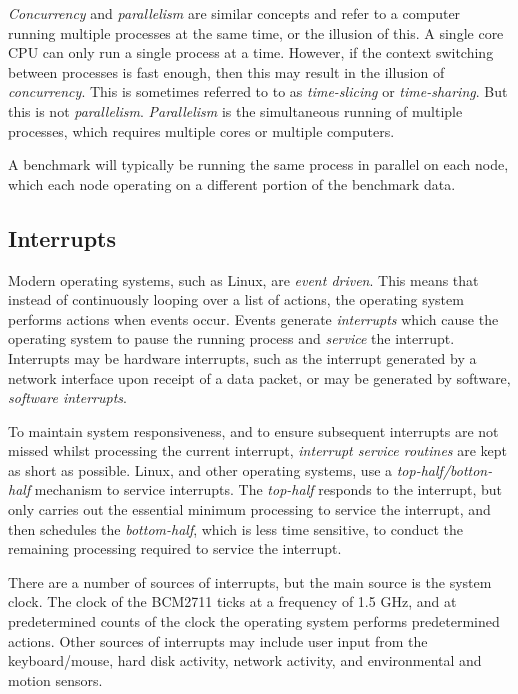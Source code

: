 \emph{Concurrency} and \emph{parallelism} are similar concepts and refer to a computer running multiple processes at the same time, or the illusion of this. A single core CPU can only run a single process at a time. However, if the context switching between processes is fast enough, then this may result in the illusion of \emph{concurrency}. This is sometimes referred to to as \emph{time-slicing} or \emph{time-sharing}. But this is not \emph{parallelism}. \emph{Parallelism} is the simultaneous running of multiple processes, which requires multiple cores or multiple computers.

A benchmark will typically be running the same process in parallel on each node, which each node operating on a different portion of the benchmark data.


\subsection{Interrupts}

Modern operating systems, such as Linux, are \emph{event driven}. This means that instead of continuously looping over a list of actions, the operating system performs actions when events occur. Events generate \emph{interrupts} which cause the operating system to pause the running process and \emph{service} the interrupt. Interrupts may be hardware interrupts, such as the interrupt generated by a network interface upon receipt of a data packet, or may be generated by software, \emph{software interrupts}.

To maintain system responsiveness, and to ensure subsequent interrupts are not missed whilst processing the current interrupt, \emph{interrupt service routines} are kept as short as possible. Linux, and other operating systems, use a \emph{top-half/botton-half} mechanism to service interrupts. The \emph{top-half} responds to the interrupt, but only carries out the essential minimum processing to service the interrupt, and then schedules the \emph{bottom-half}, which is less time sensitive, to conduct the remaining processing required to service the interrupt.

There are a number of sources of interrupts, but the main source is the system clock. The clock of the BCM2711 ticks at a frequency of 1.5 GHz, and at predetermined counts of the clock the operating system performs predetermined actions. Other sources of interrupts may include user input from the keyboard/mouse, hard disk activity, network activity, and environmental and motion sensors.

